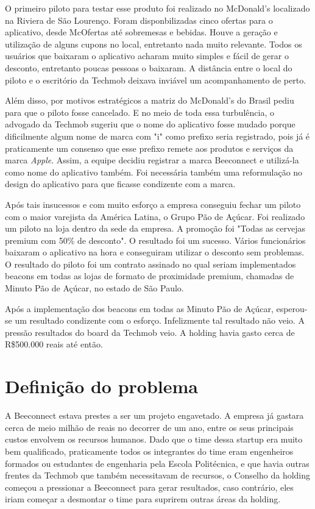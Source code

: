 O primeiro piloto para testar esse produto foi realizado no McDonald's localizado na Riviera de São Lourenço. Foram disponbilizadas cinco ofertas para o aplicativo, desde McOfertas até sobremesas e bebidas.
Houve a geração e utilização de alguns cupons no local, entretanto nada muito relevante. Todos os usuários que baixaram o aplicativo acharam muito simples e fácil de gerar o desconto, entretanto poucas pessoas o baixaram. A distância entre o local do piloto e o escritório da Techmob deixava inviável um acompanhamento de perto. 

Além disso, por motivos estratégicos a matriz do McDonald's do Brasil pediu para que o piloto fosse cancelado. E no meio de toda essa turbulência, o advogado da Techmob sugeriu que o nome do aplicativo fosse mudado porque dificilmente algum nome de marca com "i" como prefixo seria registrado, pois já é praticamente um consenso que esse prefixo remete aos produtos e serviços da marca \textit{Apple}. Assim, a equipe decidiu registrar a marca Beeconnect e utilizá-la como nome do aplicativo também. Foi necessária também uma reformulação no design do aplicativo para que ficasse condizente com a marca.

Após tais insucessos e com muito esforço a empresa conseguiu fechar um piloto com o maior varejista da América Latina, o Grupo Pão de Açúcar. Foi realizado um piloto na loja dentro da sede da empresa. A promoção foi "Todas as cervejas premium com 50\% de desconto". O resultado foi um sucesso. Vários funcionários baixaram o aplicativo na hora e conseguiram utilizar o desconto sem problemas. O resultado do piloto foi um contrato assinado no qual seriam implementados beacons em todas as lojas de formato de proximidade premium, chamadas de Minuto Pão de Açúcar, no estado de São Paulo.

Após a implementação dos beacons em todas as Minuto Pão de Açúcar, esperou-se um resultado condizente com o esforço. Infelizmente tal resultado não veio. A pressão resultados do board da Techmob veio. A holding havia gasto cerca de R\$500.000 reais até então.

\section{Definição do problema}
\label{cha:definição_do_problema}
A Beeconnect estava prestes a ser um projeto engavetado. A empresa já gastara cerca de meio milhão de reais no decorrer de um ano, entre os seus principais custos envolvem os recursos humanos. Dado que o time dessa startup era muito bem qualificado, praticamente todos os integrantes do time eram engenheiros formados ou estudantes de engenharia pela Escola Politécnica, e que havia outras frentes da Techmob que também necessitavam de recursos, o Conselho da holding começou a pressionar a Beeconnect para gerar resultados, caso contrário, eles iriam começar a desmontar o time para suprirem outras áreas da holding.

